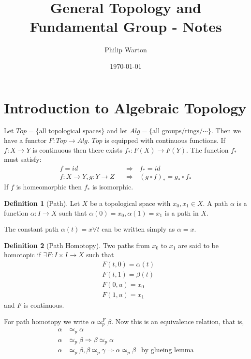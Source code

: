 \documentclass{article}
\theoremstyle{definition}
\newtheorem{definition}{Definition}[section]
\begin{document}
\title{General Topology and Fundamental Group - Notes}
\author{Philip Warton}
\date{\today}
\maketitle
\section{Introduction to Algebraic Topology}
Let $Top = \{\text{all topological spaces}\}$ and let $Alg = \{ \text{all groups/rings/
}\cdots \}$. Then we have a functor $F: Top \rightarrow Alg$.
$Top$ is equipped with continuous functions. If $f: X \rightarrow Y$ is continuous then 
there exists $f_*: F(X) \rightarrow F(Y)$. The function $f_*$ must satisfy:
\begin{align}
    f = id \ \ \ &\Longrightarrow \ \ \ f_* = id \\
    f:X\rightarrow Y,g:Y\rightarrow Z \ \ \ &\Longrightarrow \ \ \ (g \circ f)_* = g_* \circ f_*
\end{align}
If $f$ is homeomorphic then $f_*$ is isomorphic.
\begin{mdframed}
    \begin{definition}[Path]
        Let $X$ be a topological space with $x_0,x_1\in X$. A path $\alpha$ is a function 
        $\alpha : I \rightarrow X$ such that $\alpha(0) = x_0, \alpha(1) = x_1$ is a path in $X$.
    \end{definition}
\end{mdframed}
The constant path $\alpha(t) = x \forall t$ can be written simply as $\alpha = x$.
\begin{mdframed}
    \begin{definition}[Path Homotopy]
        Two paths from $x_0$ to $x_1$ are said to be homotopic if $\exists F:I \times I \rightarrow X$
        such that
        \begin{align}
            &F(t,0) = \alpha(t)\\
            &F(t,1) = \beta(t)\\
            &F(0,u) = x_0 \\
            &F(1,u) = x_1
        \end{align}
        and $F$ is continuous.
    \end{definition}
\end{mdframed}
For path homotopy we write $\alpha \simeq_p^F \beta$. Now this is an equivalence relation, that is,
\begin{align}
    \alpha &\simeq_p \alpha \\
    \alpha &\simeq_p \beta \Longrightarrow \beta \simeq_p \alpha \\
    \alpha &\simeq_p \beta, \beta \simeq_p \gamma \Longrightarrow \alpha \simeq_p \beta & \text{by glueing lemma}
\end{align}
\end{document}

